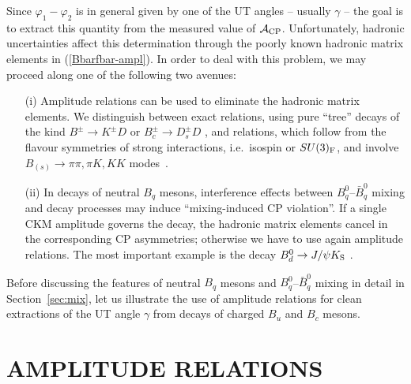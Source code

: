 \documentclass[11pt]{cernrep}
\begin{document}
Since $\varphi_1-\varphi_2$ is in general given by one of the UT angles  -- 
usually $\gamma$ -- the goal is to extract this quantity from the measured 
value of ${\cal A}_{\rm CP}$. Unfortunately, hadronic uncertainties affect this
determination through the poorly known hadronic matrix elements in 
(\ref{Bbarfbar-ampl}). In order to deal with this problem, we may proceed along 
one of the following two avenues:
\begin{itemize}
\item[(i)] Amplitude relations can be used to eliminate the 
hadronic matrix elements. We distinguish between exact relations, 
using pure ``tree'' decays  of the kind $B^\pm\to K^\pm D$ \cite{gw,ADS} or 
$B_c^\pm\to D^\pm_s D$ \cite{fw}, and relations, which follow from the flavour symmetries 
of strong interactions, i.e.\ isospin or $SU(3)_{\rm F}$, and involve 
$B_{(s)}\to\pi\pi,\pi K,KK$ modes~\cite{GHLR}. 
\item[(ii)] In decays of neutral $B_q$ mesons, interference effects 
between $B^0_q$--$\bar B^0_q$ mixing and decay processes may induce
 ``mixing-induced CP violation''. If a single CKM amplitude governs the decay, 
 the hadronic matrix elements cancel in the corresponding
CP asymmetries; otherwise we have to use again amplitude relations.
The most important example is the decay $B^0_d\to J/\psi K_{\rm S}$ \cite{bisa}.
\end{itemize}
Before discussing the features of neutral $B_q$ mesons and  
$B^0_q$--$\bar B^0_q$ mixing in detail in Section~\ref{sec:mix}, let us illustrate
the use of amplitude relations for clean extractions of the UT angle $\gamma$
from decays of charged $B_u$ and $B_c$ mesons. 


%
%
%
\section{AMPLITUDE RELATIONS}\label{sec:A-REL}
\setcounter{equation}{0}
%
%
%
\boldmath
\end{document}
